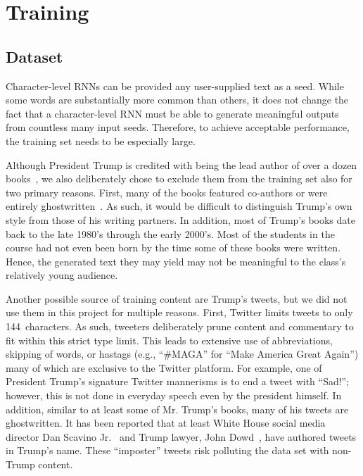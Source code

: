 \documentclass{article}
\begin{document}
\section{Training}

\subsection{Dataset}

Character-level RNNs can be provided any user-supplied text as a seed.  While some words are substantially more common than others, it does not change the fact that a character-level RNN must be able to generate meaningful outputs from countless many input seeds. Therefore, to achieve acceptable performance, the training set needs to be especially large.

Although President Trump is credited with being the lead author of over a dozen books~\cite{trumpArtOfTheDeal,trumpSurvivingAtTheTop,trumpArtOfTheComeback,trumpTheAmericaWeDeserve,trumpHowToGetRich,trumpCrippledAmerica,trumpTimeToGetTough,trumpThinkBig,trump101,trumpNeverGiveUp,trumpWhyWeWantYou,trumpBestGolfAdvice,trumpMidasTouch}, we also deliberately chose to exclude them from the training set also for two primary reasons.  First, many of the books featured co-authors or were entirely ghostwritten~\cite{mayerNewYorkerGhostwriter}.  As such, it would be difficult to distinguish Trump's own style from those of his writing partners.  In addition, most of Trump's books date back to the late 1980's through the early 2000's.  Most of the students in the course had not even been born by the time some of these books were written. Hence, the generated text they may yield may not be meaningful to the class's relatively young audience.

Another possible source of training content are Trump's tweets, but we did not use them in this project for multiple reasons.  First, Twitter limits tweets to only 144~characters. As such, tweeters deliberately prune content and commentary to fit within this strict type limit.  This leads to extensive use of abbreviations, skipping of words, or hastags (e.g., ``\#MAGA'' for ``Make America Great Again'') many of which are exclusive to the Twitter platform. For example, one of President Trump's signature Twitter mannerisms is to end a tweet with ``Sad!''; however, this is not done in everyday speech even by the president himself. In addition, similar to at least some of Mr. Trump's books, many of his tweets are ghostwritten.  It has been reported that at least White House social media director Dan Scavino Jr.~\cite{ohlheiser2017} and Trump lawyer, John Dowd~\cite{phillipsBlake2017}, have authored tweets in Trump's name.  These ``imposter'' tweets risk polluting the data set with non-Trump content.
\end{document}
